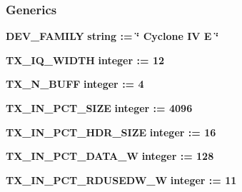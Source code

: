 \subsubsection*{Generics}
 \begin{DoxyCompactItemize}
\item 
{\bf D\+E\+V\+\_\+\+F\+A\+M\+I\+LY} {\bfseries {\bfseries \textcolor{comment}{string}\textcolor{vhdlchar}{ }\textcolor{vhdlchar}{ }\textcolor{vhdlchar}{\+:}\textcolor{vhdlchar}{=}\textcolor{vhdlchar}{ }\textcolor{vhdlchar}{ }\textcolor{vhdlchar}{ }\textcolor{vhdlchar}{ }\textcolor{keyword}{\char`\"{} Cyclone I\+V E \char`\"{}}\textcolor{vhdlchar}{ }}}
\item 
{\bf T\+X\+\_\+\+I\+Q\+\_\+\+W\+I\+D\+TH} {\bfseries {\bfseries \textcolor{comment}{integer}\textcolor{vhdlchar}{ }\textcolor{vhdlchar}{ }\textcolor{vhdlchar}{\+:}\textcolor{vhdlchar}{=}\textcolor{vhdlchar}{ }\textcolor{vhdlchar}{ } \textcolor{vhdldigit}{12} \textcolor{vhdlchar}{ }}}
\item 
{\bf T\+X\+\_\+\+N\+\_\+\+B\+U\+FF} {\bfseries {\bfseries \textcolor{comment}{integer}\textcolor{vhdlchar}{ }\textcolor{vhdlchar}{ }\textcolor{vhdlchar}{\+:}\textcolor{vhdlchar}{=}\textcolor{vhdlchar}{ }\textcolor{vhdlchar}{ } \textcolor{vhdldigit}{4} \textcolor{vhdlchar}{ }}}
\item 
{\bf T\+X\+\_\+\+I\+N\+\_\+\+P\+C\+T\+\_\+\+S\+I\+ZE} {\bfseries {\bfseries \textcolor{comment}{integer}\textcolor{vhdlchar}{ }\textcolor{vhdlchar}{ }\textcolor{vhdlchar}{\+:}\textcolor{vhdlchar}{=}\textcolor{vhdlchar}{ }\textcolor{vhdlchar}{ } \textcolor{vhdldigit}{4096} \textcolor{vhdlchar}{ }}}
\item 
{\bf T\+X\+\_\+\+I\+N\+\_\+\+P\+C\+T\+\_\+\+H\+D\+R\+\_\+\+S\+I\+ZE} {\bfseries {\bfseries \textcolor{comment}{integer}\textcolor{vhdlchar}{ }\textcolor{vhdlchar}{ }\textcolor{vhdlchar}{\+:}\textcolor{vhdlchar}{=}\textcolor{vhdlchar}{ }\textcolor{vhdlchar}{ } \textcolor{vhdldigit}{16} \textcolor{vhdlchar}{ }}}
\item 
{\bf T\+X\+\_\+\+I\+N\+\_\+\+P\+C\+T\+\_\+\+D\+A\+T\+A\+\_\+W} {\bfseries {\bfseries \textcolor{comment}{integer}\textcolor{vhdlchar}{ }\textcolor{vhdlchar}{ }\textcolor{vhdlchar}{\+:}\textcolor{vhdlchar}{=}\textcolor{vhdlchar}{ }\textcolor{vhdlchar}{ } \textcolor{vhdldigit}{128} \textcolor{vhdlchar}{ }}}
\item 
{\bf T\+X\+\_\+\+I\+N\+\_\+\+P\+C\+T\+\_\+\+R\+D\+U\+S\+E\+D\+W\+\_\+W} {\bfseries {\bfseries \textcolor{comment}{integer}\textcolor{vhdlchar}{ }\textcolor{vhdlchar}{ }\textcolor{vhdlchar}{\+:}\textcolor{vhdlchar}{=}\textcolor{vhdlchar}{ }\textcolor{vhdlchar}{ } \textcolor{vhdldigit}{11} \textcolor{vhdlchar}{ }}}

\end{DoxyCompactItemize}
